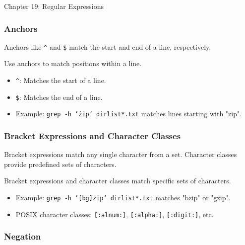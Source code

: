 \begin{notes}{Chapter 19: Regular Expressions}
\begin{highlight}
    \end{highlight}
    
    \subsubsection*{Anchors}
    
    Anchors like \texttt{\^} and \texttt{\$} match the start and end of a line, respectively.
    
    \begin{highlight}[Anchors]
    
    Use anchors to match positions within a line.
    
    \begin{itemize}
        \item \texttt{\^}: Matches the start of a line.
        \item \texttt{\$}: Matches the end of a line.
        \item Example: \texttt{grep -h '\^zip' dirlist*.txt} matches lines starting with "zip".
    \end{itemize}
    
    \end{highlight}
    
    \subsubsection*{Bracket Expressions and Character Classes}
    
    Bracket expressions match any single character from a set. Character classes provide predefined sets of characters.
    
    \begin{highlight}
    
    Bracket expressions and character classes match specific sets of characters.
    
    \begin{itemize}
        \item Example: \texttt{grep -h '[bg]zip' dirlist*.txt} matches "bzip" or "gzip".
        \item POSIX character classes: \texttt{[:alnum:]}, \texttt{[:alpha:]}, \texttt{[:digit:]}, etc.
    \end{itemize}
    
    \end{highlight}
    
    \subsubsection*{Negation}
    

\end{notes}
